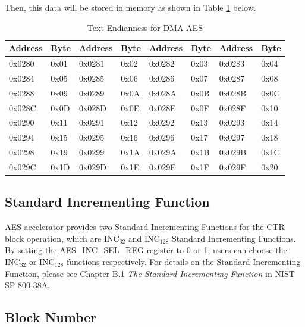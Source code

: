 \documentclass[main\_\_EN.tex]{subfiles}
\begin{document}
Then, this data will be stored in memory as shown in Table \ref{tab:aes-dma-aes-plaintext-ciphertext-endian} below.

\begin{longtable}[c]
{ | l | l |l | l | l | l | l | l |}
\caption{Text Endianness for DMA-AES}
\label{tab:aes-dma-aes-plaintext-ciphertext-endian}\\
\hline
\rowcolor{lightgray}
\textbf{Address} &  \textbf{Byte}  & \textbf{Address} &  \textbf{Byte}  & \textbf{Address} &  \textbf{Byte}  & \textbf{Address} &  \textbf{Byte} \\\hline
0x0280 & 0x01 & 0x0281 & 0x02 & 0x0282 & 0x03 & 0x0283 & 0x04 \\\hline
0x0284 & 0x05 & 0x0285 & 0x06 & 0x0286 & 0x07 & 0x0287 & 0x08 \\\hline
0x0288 & 0x09 & 0x0289 & 0x0A & 0x028A & 0x0B & 0x028B & 0x0C \\\hline
0x028C & 0x0D & 0x028D & 0x0E & 0x028E & 0x0F & 0x028F & 0x10 \\\hline
0x0290 & 0x11 & 0x0291 & 0x12 & 0x0292 & 0x13 & 0x0293 & 0x14 \\\hline
0x0294 & 0x15 & 0x0295 & 0x16 & 0x0296 & 0x17 & 0x0297 & 0x18 \\\hline
0x0298 & 0x19 & 0x0299 & 0x1A & 0x029A & 0x1B & 0x029B & 0x1C \\\hline
0x029C & 0x1D & 0x029D & 0x1E & 0x029E & 0x1F & 0x029F & 0x20 \\\hline
\end{longtable}
\subsection{Standard Incrementing Function}\label{sec:aes-Standard-Incrementing-Function}

AES accelerator provides two Standard Incrementing Functions for the CTR block operation, which are INC$_{32}$ and INC$_{128}$ Standard Incrementing Functions. By setting the  \hyperref[regdesc:AESINCSELREG]{AES\_INC\_SEL\_REG} register to 0 or 1, users can choose the INC$_{32}$ or INC$_{128}$ functions respectively. For details on the Standard Incrementing Function, please see Chapter B.1 \textit{The Standard Incrementing Function} in \href{https://nvlpubs.nist.gov/nistpubs/Legacy/SP/nistspecialpublication800-38a.pdf}{NIST SP 800-38A}.

\subsection{Block Number}\label{sec:aes-block-number}
\end{document}
